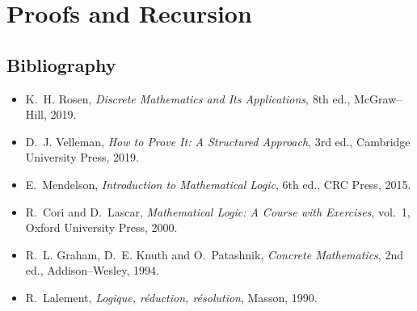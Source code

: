 \documentclass[11pt,twoside,openany]{book}
\begin{document}
\part{Proofs and Recursion}




\backmatter
\chapter{Bibliography}
\begin{itemize}
\item K.~H. Rosen, \emph{Discrete Mathematics and Its Applications}, 8th ed., McGraw--Hill, 2019.
\item D.~J. Velleman, \emph{How to Prove It: A Structured Approach}, 3rd ed., Cambridge University Press, 2019.
\item E.~Mendelson, \emph{Introduction to Mathematical Logic}, 6th ed., CRC Press, 2015.
\item R.~Cori and D.~Lascar, \emph{Mathematical Logic: A Course with Exercises}, vol.~1, Oxford University Press, 2000.
\item R.~L. Graham, D.~E. Knuth and O.~Patashnik, \emph{Concrete Mathematics}, 2nd ed., Addison--Wesley, 1994.
\item R.~Lalement, \emph{Logique, r\'eduction, r\'esolution}, Masson, 1990.
\end{itemize}
\end{document}
